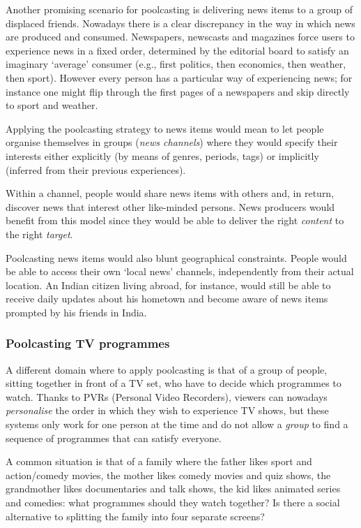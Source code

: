 Another promising scenario for poolcasting is delivering news items to a group of displaced friends.
Nowadays there is a clear discrepancy in the way in which news are produced and consumed.
Newspapers, newscasts and magazines force users to experience news in a fixed order, determined by the editorial board to satisfy an imaginary `average' consumer (e.g., first politics, then economics, then weather, then sport). 
However every person has a particular way of experiencing news; for instance one might flip through the first pages of a newspapers and skip directly to sport and weather.

Applying the poolcasting strategy to news items would mean to let people organise themselves in groups (\emph{news channels}) where they would specify their interests either explicitly (by means of genres, periods, tags) or implicitly (inferred from their previous experiences).
 
Within a channel, people would share news items with others and, in return, discover news that interest other like-minded persons. News producers would benefit from this model since they would be able to deliver the right \emph{content} to the right \emph{target}. 

Poolcasting news items would also blunt geographical constraints. 
People would be able to access their own `local news' channels, independently from their actual location. 
An Indian citizen living abroad, for instance, would still be able to receive daily updates about his hometown and become aware of news items prompted by his friends in India.

\subsubsection{Poolcasting TV programmes} %

A different domain where to apply poolcasting is that of a group of people, sitting together in front of a TV set, who have to decide which programmes to watch.
Thanks to PVRs (Personal Video Recorders), viewers can nowadays \emph{personalise} the order in which they wish to experience TV shows, but 
these systems only work for one person at the time and do not allow a \emph{group} to find a sequence of programmes that can satisfy everyone.

A common situation is that of a family where the father likes sport and action/comedy movies, the mother likes comedy movies and quiz shows, the grandmother likes documentaries and talk shows, the kid likes animated series and comedies: what programmes should they watch together?
Is there a social alternative to splitting the family into four separate screens?

